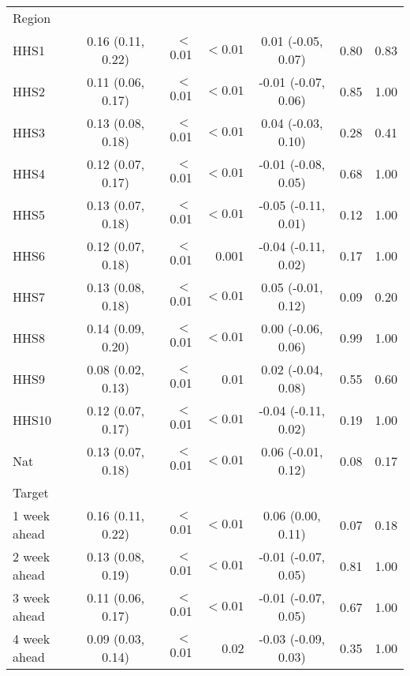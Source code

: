 \documentclass[12pt]{article}
\begin{document}
\begin{table}[ht!]
\begin{tabular}{lcrrcrr}
 Region\\    
 \hspace{3mm}	HHS1 &  0.16 (0.11, 0.22) & $<$0.01  &$<0.01$& 0.01 (-0.05, 0.07) &0.80 &0.83\\
 \hspace{3mm}	HHS2 &  0.11 (0.06, 0.17) & $<$0.01  &$<0.01$& -0.01 (-0.07, 0.06) &0.85&1.00\\
 \hspace{3mm}	HHS3 &  0.13 (0.08, 0.18) & $<$0.01  &$<0.01$& 0.04 (-0.03, 0.10) &0.28&0.41\\
 \hspace{3mm}	HHS4 &  0.12 (0.07, 0.17) & $<$0.01  &$<0.01$& -0.01 (-0.08, 0.05) &0.68&1.00\\
 \hspace{3mm}	HHS5 &  0.13 (0.07, 0.18) & $<$0.01  &$<0.01$& -0.05 (-0.11, 0.01) &0.12&1.00\\
 \hspace{3mm}	HHS6 &  0.12 (0.07, 0.18) & $<$0.01  &0.001& -0.04 (-0.11, 0.02) &0.17&1.00\\
 \hspace{3mm}	HHS7 &  0.13 (0.08, 0.18) & $<$0.01  &$<0.01$& 0.05 (-0.01, 0.12) &0.09&0.20\\
 \hspace{3mm}	HHS8 &  0.14 (0.09, 0.20) & $<$0.01  &$<0.01$& 0.00 (-0.06, 0.06) &0.99&1.00\\
 \hspace{3mm}	HHS9 &  0.08 (0.02, 0.13) & $<$0.01  &0.01& 0.02 (-0.04, 0.08) &0.55&0.60\\
 \hspace{3mm}	HHS10 & 0.12 (0.07, 0.17) & $<$0.01  &$<0.01$& -0.04 (-0.11, 0.02) &0.19&1.00\\
 \hspace{3mm}	Nat	 &  0.13 (0.07, 0.18) & $<$0.01  &$<0.01$& 0.06 (-0.01, 0.12) &0.08&0.17\\

 Target\\
 \hspace{3mm}	1 week ahead	&   0.16 (0.11, 0.22) & $<$0.01  &$<0.01$& 0.06 (0.00, 0.11) &0.07&0.18\\
 \hspace{3mm}	2 week ahead	&  0.13 (0.08, 0.19) & $<$0.01  &$<0.01$& -0.01 (-0.07, 0.05) &0.81&1.00\\
 \hspace{3mm}	3 week ahead	&  0.11 (0.06, 0.17) & $<$0.01  &$<0.01$& -0.01 (-0.07, 0.05) &0.67&1.00\\
 \hspace{3mm}	4 week ahead	&  0.09 (0.03, 0.14) & $<$0.01  &0.02& -0.03 (-0.09, 0.03) &0.35&1.00\\
 \hline
\end{tabular}


\end{table}
\end{document}
